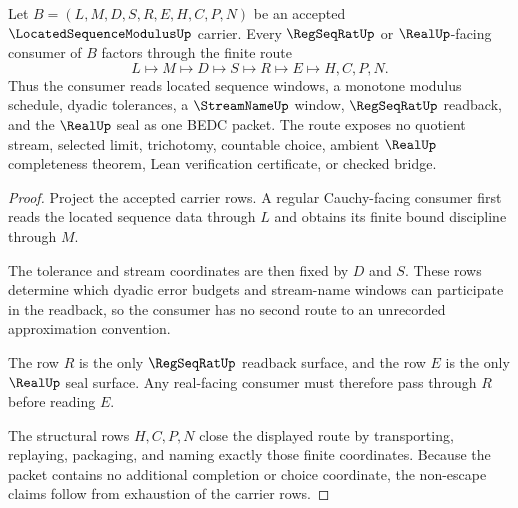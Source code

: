 \begin{theorem}
\label{thm:located-sequence-modulus-regular-cauchy-handoff}
Let $B=(L,M,D,S,R,E,H,C,P,N)$ be an accepted $\LocatedSequenceModulusUp$ carrier. Every $\RegSeqRatUp$ or $\RealUp$-facing consumer of $B$ factors through the finite route
$$
L\longmapsto M\longmapsto D\longmapsto S\longmapsto R\longmapsto E\longmapsto H,C,P,N .
$$
Thus the consumer reads located sequence windows, a monotone modulus schedule, dyadic tolerances, a $\StreamNameUp$ window, $\RegSeqRatUp$ readback, and the $\RealUp$ seal as one BEDC packet. The route exposes no quotient stream, selected limit, trichotomy, countable choice, ambient $\RealUp$ completeness theorem, Lean verification certificate, or checked bridge.
\end{theorem}
\begin{proof}
Project the accepted carrier rows. A regular Cauchy-facing consumer first reads the located sequence data through $L$ and obtains its finite bound discipline through $M$.

The tolerance and stream coordinates are then fixed by $D$ and $S$. These rows determine which dyadic error budgets and stream-name windows can participate in the readback, so the consumer has no second route to an unrecorded approximation convention.

The row $R$ is the only $\RegSeqRatUp$ readback surface, and the row $E$ is the only $\RealUp$ seal surface. Any real-facing consumer must therefore pass through $R$ before reading $E$.

The structural rows $H,C,P,N$ close the displayed route by transporting, replaying, packaging, and naming exactly those finite coordinates. Because the packet contains no additional completion or choice coordinate, the non-escape claims follow from exhaustion of the carrier rows.
\end{proof}

\begin{closurestatus}{\LocatedSequenceModulusUp}
  \theoryclosure{\seedClosure}
  \formalstatus{\unformalizedV}
\end{closurestatus}
